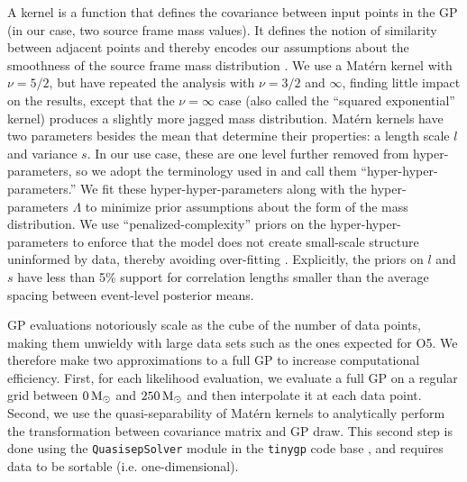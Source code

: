 \documentclass[]{aastex631}
\begin{document}
A kernel is a function that defines the covariance between input points in the GP (in our case, two source frame mass values). 
It defines the notion of similarity between adjacent points and thereby encodes our assumptions about the smoothness of the source frame mass distribution \citep{rasmussen_gaussian_2006}.
We use a Mat\'ern kernel \citep{handcock_and_stein,stein_1999} with $\nu = 5/2$, but have repeated the analysis with $\nu=3/2$ and $\infty$, finding little impact on the results, except that the $\nu=\infty$ case (also called the ``squared exponential'' kernel) produces a slightly more jagged mass distribution.
Mat\'ern kernels have two parameters besides the mean that determine their properties: a length scale $l$ and variance $s$.
In our use case, these are one level further removed from hyper-parameters, so we adopt the terminology used in \citet{callister_parameter-free_2023} and call them ``hyper-hyper-parameters.''
We fit these hyper-hyper-parameters along with the hyper-parameters $\Lambda$ to minimize prior assumptions about the form of the mass distribution.
We use ``penalized-complexity'' priors on the hyper-hyper-parameters to enforce that the model does not create small-scale structure uninformed by data, thereby avoiding over-fitting \citep{simpson_penalising_2017,simpson_garcpas_2022}. 
Explicitly, the priors on $l$ and $s$ have less than 5\% support for correlation lengths smaller than the average spacing between event-level posterior means.

\ac{GP} evaluations notoriously scale as the cube of the number of data points, making them unwieldy with large data sets such as the ones expected for \ac{O5}.
We therefore make two approximations to a full \ac{GP} to increase computational efficiency.
First, for each likelihood evaluation, we evaluate a full \ac{GP} on a regular grid between $0\,\text{M}_{\odot}$ and $250\,\text{M}_{\odot}$ and then interpolate it at each data point.
Second, we use the quasi-separability of Mat\'ern kernels to analytically perform the transformation between covariance matrix and \ac{GP} draw.
This second step is done using the \texttt{QuasisepSolver} module \citep{foreman-mackey_fast_2017} in the \texttt{tinygp} code base \citep{foreman-mackey_tinygp_2021}, and requires data to be sortable (i.e. one-dimensional).
\end{document}
